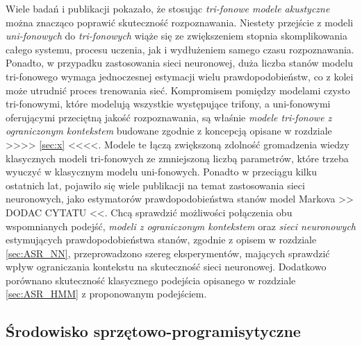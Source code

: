 \documentclass[11pt]{article}
\begin{document}
	Wiele badań i publikacji pokazało, że stosując \textit{tri-fonowe modele akustyczne} można znacząco poprawić skuteczność rozpoznawania. Niestety przejście z modeli \textit{uni-fonowych} do \textit{tri-fonowych} wiąże się ze zwiększeniem stopnia skomplikowania całego systemu, procesu uczenia, jak i wydłużeniem samego czasu rozpoznawania. Ponadto, w przypadku zastosowania sieci neuronowej, duża liczba stanów modelu tri-fonowego wymaga jednoczesnej estymacji wielu prawdopodobieństw, co z kolei może utrudnić proces trenowania sieć. Kompromisem pomiędzy modelami czysto tri-fonowymi, które modelują wszystkie występujące trifony, a uni-fonowymi oferującymi przeciętną jakość rozpoznawania, są właśnie \textit{modele tri-fonowe z ograniczonym kontekstem} budowane zgodnie z koncepcją opisane w rozdziale >>>> \ref{sec:x} <<<<. Modele te łączą zwiększoną zdolność gromadzenia wiedzy klasycznych modeli tri-fonowych ze zmniejszoną liczbą parametrów, które trzeba wyuczyć w klasycznym modelu uni-fonowych. Ponadto w przeciągu kilku ostatnich lat, pojawiło się wiele publikacji na temat zastosowania sieci neuronowych, jako estymatorów prawdopodobieństwa stanów model Markova >> DODAC CYTATU <<. Chcą sprawdzić możliwości połączenia obu wspomnianych podejść, \textit{modeli z ograniczonym kontekstem} oraz \textit{sieci neuronowych} estymujących prawdopodobieństwa stanów, zgodnie z opisem w rozdziale \ref{sec:ASR_NN}, przeprowadzono szereg eksperymentów, mających sprawdzić wpływ ograniczania kontekstu na skuteczność sieci neuronowej. Dodatkowo porównano skuteczność klasycznego podejścia opisanego w rozdziale \ref{sec:ASR_HMM} z proponowanym podejściem. 
	
	
	\subsection{ Środowisko sprzętowo-programisytyczne }
	
\end{document}
